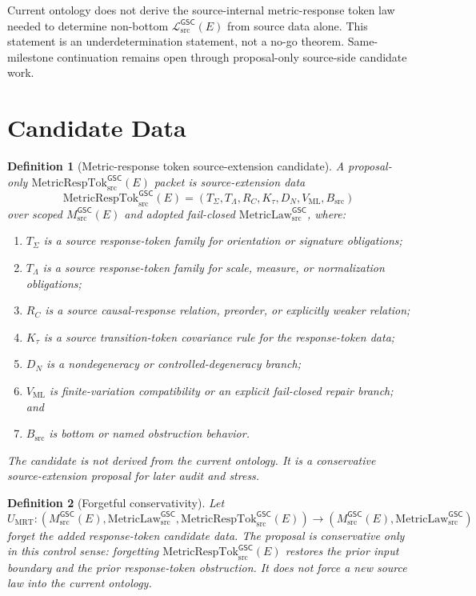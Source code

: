 \documentclass[11pt]{article}
\newcommand{\MsrcGSC}{M_{\mathrm{src}}^{\mathsf{GSC}}}
\newcommand{\MetricLaw}{\mathrm{MetricLaw}_{\mathrm{src}}^{\mathsf{GSC}}}
\newcommand{\MetricRespTok}{\mathrm{MetricRespTok}_{\mathrm{src}}^{\mathsf{GSC}}}
\newcommand{\MetricData}{\mathcal{L}_{\mathrm{src}}^{\mathsf{GSC}}}
\newtheorem{definition}{Definition}
\begin{document}
Current ontology does not derive the source-internal metric-response token law
needed to determine non-bottom \(\MetricData(E)\) from source data alone.
This statement is an underdetermination statement, not a no-go theorem.
Same-milestone continuation remains open through proposal-only source-side
candidate work.

\section{Candidate Data}

\begin{definition}[Metric-response token source-extension candidate]
A proposal-only \(\MetricRespTok(E)\) packet is source-extension data
\[
  \MetricRespTok(E)
  =
  (
    T_{\Sigma},
    T_{\Lambda},
    R_C,
    K_{\tau},
    D_N,
    V_{\mathrm{ML}},
    B_{\mathrm{src}}
  )
\]
over scoped \(\MsrcGSC(E)\) and adopted fail-closed \(\MetricLaw\), where:
\begin{enumerate}[leftmargin=*]
  \item \(T_{\Sigma}\) is a source response-token family for orientation or
  signature obligations;
  \item \(T_{\Lambda}\) is a source response-token family for scale,
  measure, or normalization obligations;
  \item \(R_C\) is a source causal-response relation, preorder, or explicitly
  weaker relation;
  \item \(K_{\tau}\) is a source transition-token covariance rule for the
  response-token data;
  \item \(D_N\) is a nondegeneracy or controlled-degeneracy branch;
  \item \(V_{\mathrm{ML}}\) is finite-variation compatibility or an explicit
  fail-closed repair branch; and
  \item \(B_{\mathrm{src}}\) is bottom or named obstruction behavior.
\end{enumerate}
The candidate is not derived from the current ontology. It is a conservative
source-extension proposal for later audit and stress.
\end{definition}

\begin{definition}[Forgetful conservativity]
Let
\[
  U_{\mathrm{MRT}}:
  (\MsrcGSC(E),\MetricLaw,\MetricRespTok(E))
  \longrightarrow
  (\MsrcGSC(E),\MetricLaw)
\]
forget the added response-token candidate data. The proposal is conservative
only in this control sense: forgetting \(\MetricRespTok(E)\) restores the
prior input boundary and the prior response-token obstruction. It does not
force a new source law into the current ontology.
\end{definition}
\end{document}
